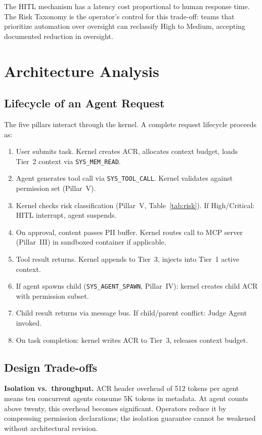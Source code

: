 \documentclass[journal]{IEEEtran}
\begin{document}
The HITL mechanism has a latency cost proportional to human response time. The Risk Taxonomy is the operator's control for this trade-off: teams that prioritize automation over oversight can reclassify High to Medium, accepting documented reduction in oversight.

\section{Architecture Analysis}
\label{sec:analysis}

\subsection{Lifecycle of an Agent Request}

The five pillars interact through the kernel. A complete request lifecycle proceeds as:

\begin{enumerate}
  \item User submits task. Kernel creates ACR, allocates context budget, loads Tier~2 context via \texttt{SYS\_MEM\_READ}.
  \item Agent generates tool call via \texttt{SYS\_TOOL\_CALL}. Kernel validates against permission set (Pillar~V).
  \item Kernel checks risk classification (Pillar~V, Table~\ref{tab:risk}). If High/Critical: HITL interrupt, agent suspends.
  \item On approval, content passes PII buffer. Kernel routes call to MCP server (Pillar~III) in sandboxed container if applicable.
  \item Tool result returns. Kernel appends to Tier~3, injects into Tier~1 active context.
  \item If agent spawns child (\texttt{SYS\_AGENT\_SPAWN}, Pillar~IV): kernel creates child ACR with permission subset.
  \item Child result returns via message bus. If child/parent conflict: Judge Agent invoked.
  \item On task completion: kernel writes ACR to Tier~3, releases context budget.
\end{enumerate}

\subsection{Design Trade-offs}

\textbf{Isolation vs.\ throughput.} ACR header overhead of 512 tokens per agent means ten concurrent agents consume 5K tokens in metadata. At agent counts above twenty, this overhead becomes significant. Operators reduce it by compressing permission declarations; the isolation guarantee cannot be weakened without architectural revision.
\end{document}
